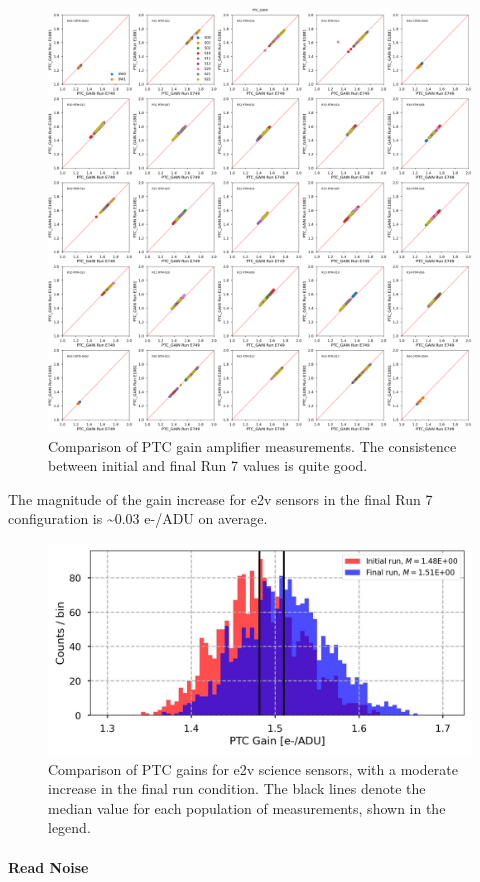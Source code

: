 \begin{figure}[ht]
    \centering
    \includegraphics[width=0.7\linewidth]{figures/finalCharacterization/E749_E1881_PTC_GAIN.png}
    \caption{Comparison of PTC gain amplifier measurements.  The consistence between initial and final Run 7 values is quite good.}
    \label{fig:finalChar-PTCGain-5x5}
\end{figure}

The magnitude of the gain increase for e2v sensors in the final Run 7 configuration is \textasciitilde0.03 e-/ADU on average.

\begin{figure}[ht]
    \centering
    \includegraphics[width=0.7\linewidth]{figures/finalCharacterization/PTCGainComp.jpg}
    \caption{Comparison of PTC gains for e2v science sensors, with a moderate increase in the final run condition. The black lines denote the median value for each population of measurements, shown in the legend.}
    \label{fig:finalChar-PTCGain_HistComp}
\end{figure}

\clearpage

\paragraph{Read Noise}\label{sec:finalChar:ReadNoise}

